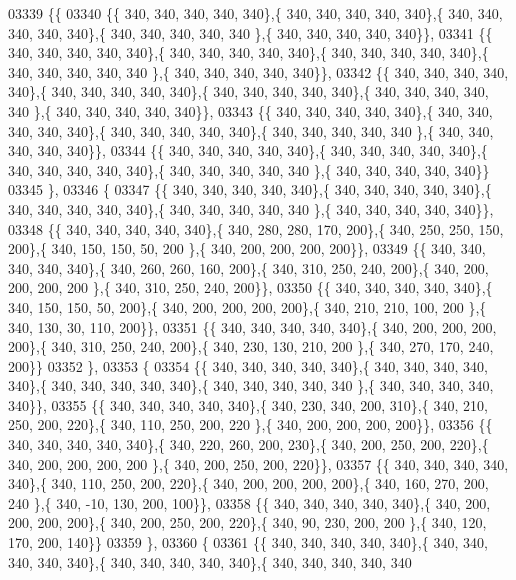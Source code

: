\begin{DoxyCode}
03339 \{\{
03340 \{\{ 340, 340, 340, 340, 340\},\{ 340, 340, 340, 340, 340\},\{ 340, 340, 340, 340, 340\},\{ 340, 340, 340, 340, 340
      \},\{ 340, 340, 340, 340, 340\}\},
03341 \{\{ 340, 340, 340, 340, 340\},\{ 340, 340, 340, 340, 340\},\{ 340, 340, 340, 340, 340\},\{ 340, 340, 340, 340, 340
      \},\{ 340, 340, 340, 340, 340\}\},
03342 \{\{ 340, 340, 340, 340, 340\},\{ 340, 340, 340, 340, 340\},\{ 340, 340, 340, 340, 340\},\{ 340, 340, 340, 340, 340
      \},\{ 340, 340, 340, 340, 340\}\},
03343 \{\{ 340, 340, 340, 340, 340\},\{ 340, 340, 340, 340, 340\},\{ 340, 340, 340, 340, 340\},\{ 340, 340, 340, 340, 340
      \},\{ 340, 340, 340, 340, 340\}\},
03344 \{\{ 340, 340, 340, 340, 340\},\{ 340, 340, 340, 340, 340\},\{ 340, 340, 340, 340, 340\},\{ 340, 340, 340, 340, 340
      \},\{ 340, 340, 340, 340, 340\}\}
03345 \},
03346 \{
03347 \{\{ 340, 340, 340, 340, 340\},\{ 340, 340, 340, 340, 340\},\{ 340, 340, 340, 340, 340\},\{ 340, 340, 340, 340, 340
      \},\{ 340, 340, 340, 340, 340\}\},
03348 \{\{ 340, 340, 340, 340, 340\},\{ 340, 280, 280, 170, 200\},\{ 340, 250, 250, 150, 200\},\{ 340, 150, 150,  50, 200
      \},\{ 340, 200, 200, 200, 200\}\},
03349 \{\{ 340, 340, 340, 340, 340\},\{ 340, 260, 260, 160, 200\},\{ 340, 310, 250, 240, 200\},\{ 340, 200, 200, 200, 200
      \},\{ 340, 310, 250, 240, 200\}\},
03350 \{\{ 340, 340, 340, 340, 340\},\{ 340, 150, 150,  50, 200\},\{ 340, 200, 200, 200, 200\},\{ 340, 210, 210, 100, 200
      \},\{ 340, 130,  30, 110, 200\}\},
03351 \{\{ 340, 340, 340, 340, 340\},\{ 340, 200, 200, 200, 200\},\{ 340, 310, 250, 240, 200\},\{ 340, 230, 130, 210, 200
      \},\{ 340, 270, 170, 240, 200\}\}
03352 \},
03353 \{
03354 \{\{ 340, 340, 340, 340, 340\},\{ 340, 340, 340, 340, 340\},\{ 340, 340, 340, 340, 340\},\{ 340, 340, 340, 340, 340
      \},\{ 340, 340, 340, 340, 340\}\},
03355 \{\{ 340, 340, 340, 340, 340\},\{ 340, 230, 340, 200, 310\},\{ 340, 210, 250, 200, 220\},\{ 340, 110, 250, 200, 220
      \},\{ 340, 200, 200, 200, 200\}\},
03356 \{\{ 340, 340, 340, 340, 340\},\{ 340, 220, 260, 200, 230\},\{ 340, 200, 250, 200, 220\},\{ 340, 200, 200, 200, 200
      \},\{ 340, 200, 250, 200, 220\}\},
03357 \{\{ 340, 340, 340, 340, 340\},\{ 340, 110, 250, 200, 220\},\{ 340, 200, 200, 200, 200\},\{ 340, 160, 270, 200, 240
      \},\{ 340, -10, 130, 200, 100\}\},
03358 \{\{ 340, 340, 340, 340, 340\},\{ 340, 200, 200, 200, 200\},\{ 340, 200, 250, 200, 220\},\{ 340,  90, 230, 200, 200
      \},\{ 340, 120, 170, 200, 140\}\}
03359 \},
03360 \{
03361 \{\{ 340, 340, 340, 340, 340\},\{ 340, 340, 340, 340, 340\},\{ 340, 340, 340, 340, 340\},\{ 340, 340, 340, 340, 340

\end{DoxyCode}
